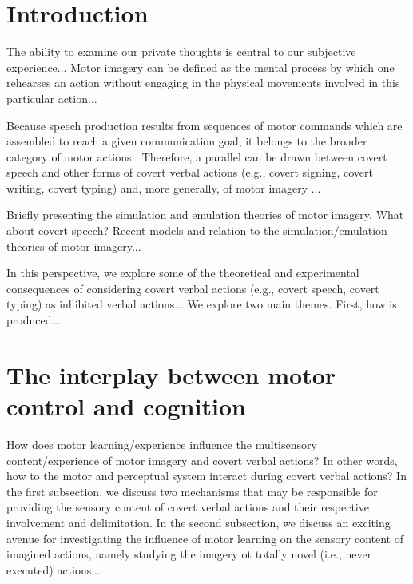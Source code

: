 \documentclass[utf8]{template/frontiersSCNS} %
\begin{document}
\newpage

\section{Introduction}


The ability to examine our private thoughts is central to our subjective experience... Motor imagery can be defined as the mental process by which one rehearses an action without engaging in the physical movements involved in this particular action...

Because speech production results from sequences of motor commands which are assembled to reach a given communication goal, it belongs to the broader category of motor actions \citep{jeannerod_motor_2006}. Therefore, a parallel can be drawn between covert speech and other forms of covert verbal actions (e.g., covert signing, covert writing, covert typing) and, more generally, of motor imagery \citep{alderson-day_inner_2015, perrone-bertolotti_what_2014, loevenbruck_cognitive_2018}...

Briefly presenting the simulation and emulation theories of motor imagery. What about covert speech? Recent models and relation to the simulation/emulation theories of motor imagery...

In this perspective, we explore some of the theoretical and experimental consequences of considering covert verbal actions (e.g., covert speech, covert typing) as inhibited verbal actions... We explore two main themes. First, how is produced...

\section{The interplay between motor control and cognition}

How does motor learning/experience influence the multisensory content/experience of motor imagery and covert verbal actions? In other words, how to the motor and perceptual system interact during covert verbal actions? In the first subsection, we discuss two mechanisms that may be responsible for providing the sensory content of covert verbal actions and their respective involvement and delimitation. In the second subsection, we discuss an exciting avenue for investigating the influence of motor learning on the sensory content of imagined actions, namely studying the imagery ot totally novel (i.e., never executed) actions...
\end{document}
